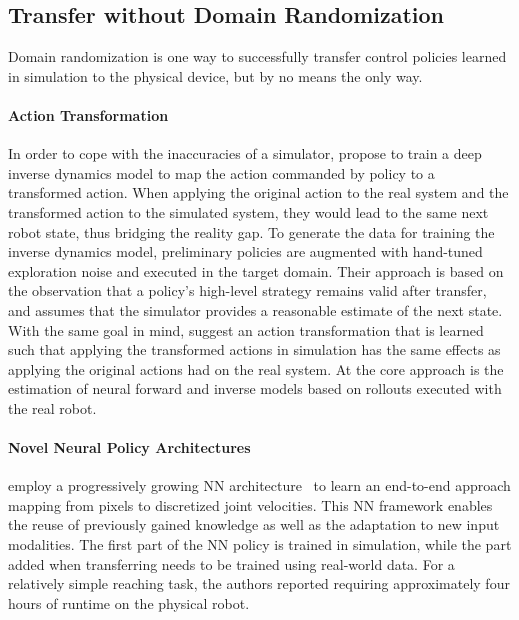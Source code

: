 \documentclass[utf8]{frontiersSCNS} %
\begin{document}
\subsection{\SimtoReal Transfer without Domain Randomization}
\label{sec_sota_transfer_wo_domain_randomization}
Domain randomization is one way to successfully transfer control policies learned in simulation to the physical device, but by no means the only way.

\paragraph*{Action Transformation}
In order to cope with the inaccuracies of a simulator, \citet{Christiano_Zaremba_16} propose to train a deep inverse dynamics model to map the action commanded by policy to a transformed action. When applying the original action to the real system and the transformed action to the simulated system, they would lead to the same next robot state, thus bridging the reality gap.
To generate the data for training the inverse dynamics model, preliminary policies are augmented with hand-tuned exploration noise and executed in the target domain.
Their approach is based on the observation that a policy's high-level strategy remains valid after \simtoreal transfer, and assumes that the simulator provides a reasonable estimate of the next state.
With the same goal in mind, \citet{Hanna_Stone_17} suggest an action transformation that is learned such that applying the transformed actions in simulation has the same effects as applying the original actions had on the real system.
At the core approach is the estimation of neural forward and inverse models based on rollouts executed with the real robot.
%

\paragraph*{Novel Neural Policy Architectures}
\citet{Rusu_Hadsell_17} employ a progressively growing \ac{NN} architecture~\citep{Rusu_Hadsell_16} to learn an end-to-end approach mapping from pixels to discretized joint velocities. 
This \ac{NN} framework enables the reuse of previously gained knowledge as well as the adaptation to new input modalities.
The first part of the \ac{NN} policy is trained in simulation, while the part added when transferring needs to be trained using real-world data.
For a relatively simple reaching task, the authors reported requiring approximately four hours of runtime on the physical robot.
\end{document}

